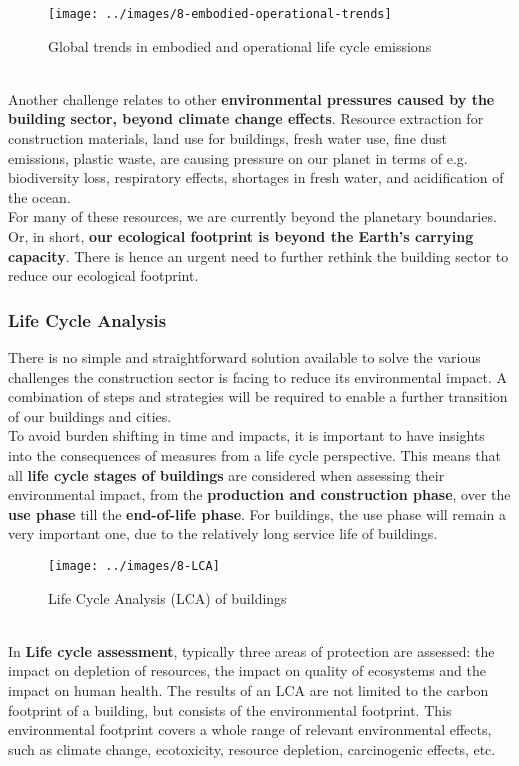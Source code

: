 \documentclass[../summary.tex]{subfiles}
\begin{document}
\begin{figure}[H]
	\centering
	\texttt{[image: ../images/8-embodied-operational-trends]}
	\caption{Global trends in embodied and operational life cycle emissions}
	\label{fig:embodied-operational-trends}
\end{figure}

\ \\
Another challenge relates to other \textbf{environmental pressures caused by the building sector, beyond climate change effects}. Resource extraction for construction materials, land use for buildings, fresh water use, fine dust emissions, plastic waste, are causing pressure on our planet in terms of e.g. biodiversity loss, respiratory effects, shortages in fresh water, and acidification of the ocean.
\\
For many of these resources, we are currently beyond the planetary boundaries. Or, in short, \textbf{our ecological footprint is beyond the Earth's carrying capacity}. There is hence an urgent need to further rethink the building sector to reduce our ecological footprint.

\subsubsection{Life Cycle Analysis}

There is no simple and straightforward solution available to solve the various challenges the construction sector is facing to reduce its environmental impact. A combination of steps and strategies will be required to enable a further transition of our buildings and cities.
\\
To avoid burden shifting in time and impacts, it is important to have insights into the consequences of measures from a life cycle perspective. This means that all \textbf{life cycle stages of buildings} are considered when assessing their environmental impact, from the \textbf{production and construction phase}, over the \textbf{use phase} till the \textbf{end-of-life phase}. For buildings, the use phase will remain a very important one, due to the relatively long service life of buildings.

\begin{figure}[H]
	\centering
	\texttt{[image: ../images/8-LCA]}
	\caption{Life Cycle Analysis (LCA) of buildings}
	\label{fig:lca}
\end{figure}

\ \\
In \textbf{Life cycle assessment}, typically three areas of protection are assessed: the impact on depletion of resources, the impact on quality of ecosystems and the impact on human health. The results of an LCA are not limited to the carbon footprint of a building, but consists of the environmental footprint. This environmental footprint covers a whole range of relevant environmental effects, such as climate change, ecotoxicity, resource depletion, carcinogenic effects, etc.
\end{document}
